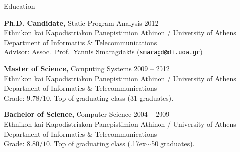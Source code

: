 \documentclass{resume}
\begin{document}
\newcommand{\mytilde}{\raise.17ex\hbox{$\scriptstyle\mathtt{\sim}$}}


\begin{rSection}{Education}

{\bf Ph.D. Candidate,} Static Program Analysis \hfill {2012 --} \\
Ethnikon kai Kapodistriakon Panepistimion Athinon / University of Athens \\
Department of Informatics \& Telecommunications \\
Advisor: Assoc.~Prof.~Yannis Smaragdakis
(\href{mailto:smaragd@di.uoa.gr}{\nolinkurl{smaragd@di.uoa.gr}})

{\bf Master of Science,} Computing Systems \hfill {2009 -- 2012} \\
Ethnikon kai Kapodistriakon Panepistimion Athinon / University of Athens \\
Department of Informatics \& Telecommunications \\
Grade: $9.78 / 10$. Top of graduating class (31 graduates).

{\bf Bachelor of Science,} Computer Science \hfill {2004 -- 2009}  \\
Ethnikon kai Kapodistriakon Panepistimion Athinon / University of Athens \\
Department of Informatics \& Telecommunications \\
Grade: $8.80 / 10$. Top of graduating class (\mytilde{}50 graduates).

\end{rSection}

\end{document}
